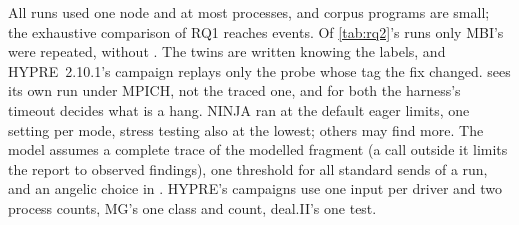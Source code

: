 All runs used one node and at most \nScaleNpMax processes, and corpus programs are small; the exhaustive comparison of RQ1 reaches \nEsixMaxEvents events. Of
\cref{tab:rq2}'s runs only MBI's were repeated, without \MUST. The \Ltwo twins are
written knowing the labels, and HYPRE~2.10.1's campaign replays only the probe whose tag the
fix changed. \MUST sees its own run under MPICH, not the traced one,
and for both the harness's timeout decides what is a hang.
NINJA ran at the default eager limits, one setting per mode, stress testing also at the
lowest; others may find more. The model assumes a
complete trace of the modelled fragment (a call outside it limits the report to observed
findings), one threshold for all standard sends of a run, and an angelic choice in
. HYPRE's campaigns use one input per driver and two process counts, MG's
one class and count, deal.II's one test.
